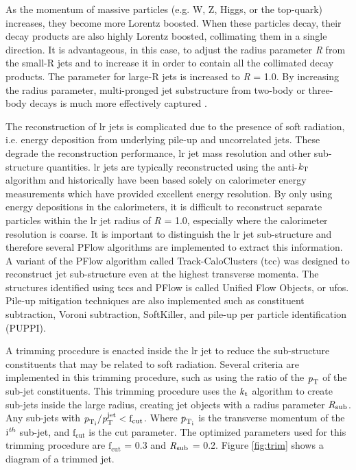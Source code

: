 As the momentum of massive particles (e.g. W, Z, Higgs, or the top-quark) increases, they become more Lorentz boosted. When these particles decay, their decay products are also 
highly Lorentz boosted, collimating them in a single direction. It is advantageous, in this case, to adjust the radius parameter \textit{R} from the small-R jets and to increase it in 
order to contain all the collimated decay products. The parameter for large-R jets is increased to \textit{R} = 1.0. By increasing the radius parameter, multi-pronged jet 
substructure from two-body or three-body decays is much more effectively captured \cite{LR-jets}.  
\par
The reconstruction of \gls{lr} jets is complicated due to the presence of soft radiation, i.e. energy deposition from underlying pile-up and uncorrelated jets. These degrade the 
reconstruction performance, \gls{lr} jet mass resolution and other sub-structure quantities. \gls{lr} jets are typically reconstructed using the anti-$\textrm{\textit{k}}_{\textrm{T}}$ algorithm and historically 
have been based solely on calorimeter energy measurements which have provided excellent energy resolution. By only using energy depositions in the calorimeters, it is difficult 
to reconstruct separate particles within the \gls{lr} jet radius of \textit{R} = 1.0, especially where the calorimeter resolution is coarse. It is important to distinguish the 
\gls{lr} jet sub-structure and therefore several PFlow algorithms are implemented to extract this information. A variant of the PFlow algorithm called Track-CaloClusters (\gls{tcc})
was designed to reconstruct jet sub-structure even at the highest transverse momenta. The structures identified using \gls{tcc}s and PFlow is called Unified Flow Objects, or 
\gls{ufo}s. Pile-up mitigation techniques are also implemented such as constituent subtraction, Voroni subtraction, SoftKiller, and pile-up per particle identification (PUPPI).
\par
A trimming procedure is enacted inside the \gls{lr} jet to reduce the sub-structure constituents that may be related to soft radiation. Several criteria are implemented in this 
trimming procedure, such as using the ratio of the $\textrm{\textit{p}}_{\textrm{T}}$ of the sub-jet constituents. This trimming procedure uses the $\textrm{\textit{k}}_{\textrm{t}}$ algorithm to create sub-jets 
inside the large radius, creating jet objects with a radius parameter $\textrm{\textit{R}}_{\textrm{sub}}$. Any sub-jets with $\textrm{\textit{p}}_{\textrm{T}_{\textrm{i}}}/\textrm{\textit{p}}_{\textrm{T}}^{\textrm{jet}} < \textrm{f}_{\textrm{cut}}$.
Where $\textrm{\textit{p}}_{\textrm{T}_{\textrm{i}}}$ is the transverse momentum of the $\textrm{i}^{\textit{\textrm{th}}}$ sub-jet, and $\textrm{f}_{\textrm{cut}}$ is the cut parameter.
The optimized parameters used for this trimming procedure are $\textrm{f}_{\textrm{cut}}$ = 0.3 and $\textrm{\textit{R}}_{\textrm{sub}}$ = 0.2. Figure \ref{fig:trim} shows a diagram of a trimmed jet.

